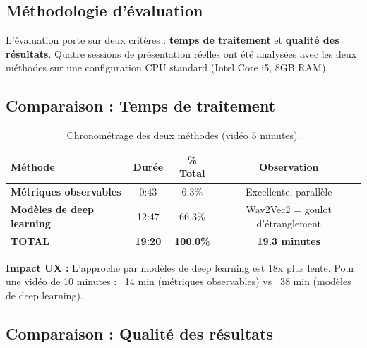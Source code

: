 \documentclass[12pt,a4paper]{article}
\begin{document}
\subsection{Méthodologie d'évaluation}
L'évaluation porte sur deux critères : \textbf{temps de traitement} et \textbf{qualité des résultats}. Quatre sessions de présentation réelles ont été analysées avec les deux méthodes sur une configuration CPU standard (Intel Core i5, 8GB RAM).

\subsection{Comparaison : Temps de traitement}

\begin{table}[H]
    \centering
    \footnotesize
    \begin{tabularx}{\textwidth}{@{}lccc@{}}
        \toprule
        \textbf{Méthode} & \textbf{Durée} & \textbf{\% Total} & \textbf{Observation} \\
        \midrule
        \textbf{Métriques observables} & 0:43 & 6.3\% & Excellente, parallèle \\
        \textbf{Modèles de deep learning} & 12:47 & 66.3\% & Wav2Vec2 = goulot d'étranglement \\
        \midrule
        \textbf{TOTAL} & \textbf{19:20} & \textbf{100.0\%} & \textbf{19.3 minutes} \\
        \bottomrule
    \end{tabularx}
    \caption{Chronométrage des deux méthodes (vidéo 5 minutes).}
\end{table}

\textbf{Impact UX :} L'approche par modèles de deep learning est 18x plus lente. Pour une vidéo de 10 minutes : ~14 min (métriques observables) vs ~38 min (modèles de deep learning).

\subsection{Comparaison : Qualité des résultats}
\end{document}
